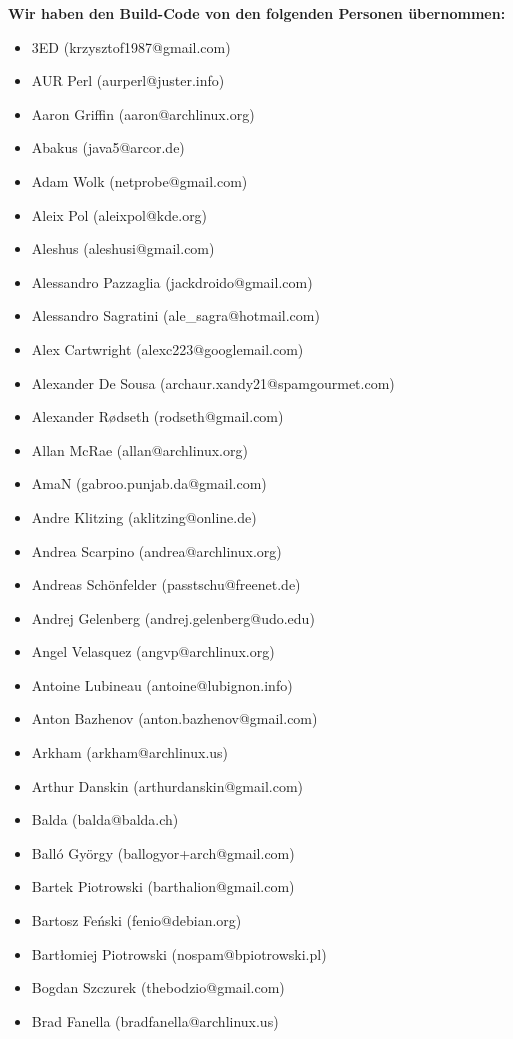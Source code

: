 \textbf{Wir haben den Build-Code von den folgenden Personen übernommen:}
\begin{itemize}
\item  3ED (krzysztof1987@gmail.com)
\item  AUR Perl (aurperl@juster.info)
\item  Aaron Griffin (aaron@archlinux.org)
\item  Abakus (java5@arcor.de)
\item  Adam Wolk (netprobe@gmail.com)
\item  Aleix Pol (aleixpol@kde.org)
\item  Aleshus (aleshusi@gmail.com)
\item  Alessandro Pazzaglia (jackdroido@gmail.com)
\item  Alessandro Sagratini (ale\_sagra@hotmail.com)
\item  Alex Cartwright (alexc223@googlemail.com)
\item  Alexander De Sousa (archaur.xandy21@spamgourmet.com)
\item  Alexander Rødseth (rodseth@gmail.com)
\item  Allan McRae (allan@archlinux.org)
\item  AmaN (gabroo.punjab.da@gmail.com)
\item  Andre Klitzing (aklitzing@online.de)
\item  Andrea Scarpino (andrea@archlinux.org)
\item  Andreas Schönfelder (passtschu@freenet.de)
\item  Andrej Gelenberg (andrej.gelenberg@udo.edu)
\item  Angel Velasquez (angvp@archlinux.org)
\item  Antoine Lubineau (antoine@lubignon.info)
\item  Anton Bazhenov (anton.bazhenov@gmail.com)
\item  Arkham (arkham@archlinux.us)
\item  Arthur Danskin (arthurdanskin@gmail.com)
\item  Balda (balda@balda.ch)
\item  Balló György (ballogyor+arch@gmail.com)
\item  Bartek Piotrowski (barthalion@gmail.com)
\item  Bartosz Feński (fenio@debian.org)
\item  Bartłomiej Piotrowski (nospam@bpiotrowski.pl)
\item  Bogdan Szczurek (thebodzio@gmail.com)
\item  Brad Fanella (bradfanella@archlinux.us)

\end{itemize}
